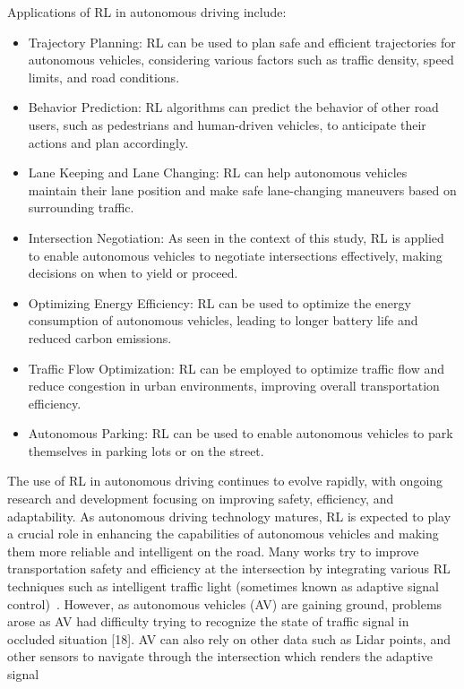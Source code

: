 Applications of RL in autonomous driving include:
\begin{itemize}
    \item Trajectory Planning: RL can be used to plan safe and efficient trajectories for autonomous vehicles, considering various factors such as traffic density, speed limits, and road conditions.
    \item Behavior Prediction: RL algorithms can predict the behavior of other road users, such as pedestrians and human-driven vehicles, to anticipate their actions and plan accordingly.
    \item Lane Keeping and Lane Changing: RL can help autonomous vehicles maintain their lane position and make safe lane-changing maneuvers based on surrounding traffic.
    \item Intersection Negotiation: As seen in the context of this study, RL is applied to enable autonomous vehicles to negotiate intersections effectively, making decisions on when to yield or proceed.
    \item Optimizing Energy Efficiency: RL can be used to optimize the energy consumption of autonomous vehicles, leading to longer battery life and reduced carbon emissions.
    \item Traffic Flow Optimization: RL can be employed to optimize traffic flow and reduce congestion in urban environments, improving overall transportation efficiency.
    \item Autonomous Parking: RL can be used to enable autonomous vehicles to park themselves in parking lots or on the street.
\end{itemize}
The use of RL in autonomous driving continues to evolve rapidly, with ongoing research and development focusing on improving safety, efficiency, and adaptability.
As autonomous driving technology matures, RL is expected to play a crucial role in enhancing the capabilities of autonomous vehicles and making them more reliable and intelligent on the road.
Many works try to improve transportation safety and
efficiency at the intersection by integrating various RL
techniques such as intelligent traffic light (sometimes known
as adaptive signal control)~\cite{yang2022inductive, wang2021adaptive, essa2020selflearning}.
However, as
autonomous vehicles (AV) are gaining ground, problems
arose as AV had difficulty trying to recognize the state of
traffic signal in occluded situation [18].
AV can also rely on
other data such as Lidar points, and other sensors to navigate
through the intersection which renders the adaptive signal

